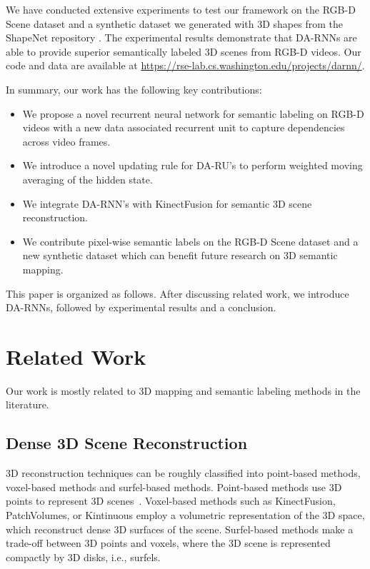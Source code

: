 \documentclass[conference]{IEEEtran}
\begin{document}
We have conducted extensive experiments to test our framework on the RGB-D Scene dataset \cite{lai2014unsupervised} and a synthetic dataset we generated with 3D shapes from the ShapeNet repository \cite{chang2015shapenet}. The experimental results demonstrate that DA-RNNs are able to provide superior semantically labeled 3D scenes from RGB-D videos. Our code and data are available at \url{https://rse-lab.cs.washington.edu/projects/darnn/}.

In summary, our work has the following key contributions:
\begin{itemize}	
	\item We propose a novel recurrent neural network for semantic labeling on RGB-D videos with a new data associated recurrent unit to capture dependencies across video frames.
	\item We introduce a novel updating rule for DA-RU's to perform weighted moving averaging of the hidden state. 
	\item We integrate DA-RNN's with KinectFusion for semantic 3D scene reconstruction.
	\item We contribute pixel-wise semantic labels on the RGB-D Scene dataset \cite{lai2014unsupervised} and a new synthetic dataset which can benefit future research on 3D semantic mapping.
\end{itemize} 

This paper is organized as follows. After discussing related work, we introduce DA-RNNs, followed by experimental results and a conclusion.

\section{Related Work}

Our work is mostly related to 3D mapping and semantic labeling methods in the literature.

\subsection{Dense 3D Scene Reconstruction}

3D reconstruction techniques can be roughly classified into point-based methods, voxel-based methods and surfel-based methods. Point-based methods use 3D points to represent  3D scenes~\cite{snavely2008skeletal,crandall2011discrete,henry2012rgb}. Voxel-based methods such as KinectFusion, PatchVolumes, or Kintinuous \cite{newcombe2011kinectfusion,henry2013patch,Whe12Kin} employ a volumetric representation of the 3D space, which reconstruct dense 3D surfaces of the scene. Surfel-based methods \cite{keller2013real,henry2012rgb,whelan2015elasticfusion} make a trade-off between 3D points and voxels, where the 3D scene is represented compactly by 3D disks, i.e., surfels.
\end{document}
